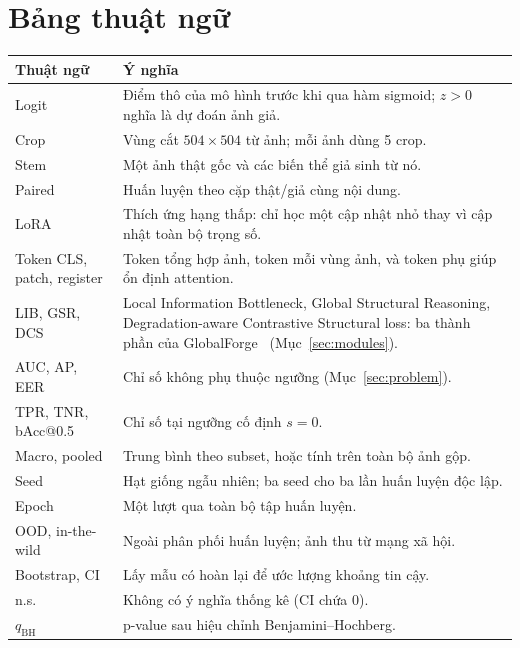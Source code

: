 \documentclass[11pt,a4paper]{article}
\begin{document}
\section{Bảng thuật ngữ}
\begin{table}[H]\centering\small
\begin{tabularx}{\linewidth}{l X}
\toprule
Thuật ngữ & Ý nghĩa \\
\midrule
Logit & Điểm thô của mô hình trước khi qua hàm sigmoid; $z>0$ nghĩa là dự đoán ảnh giả. \\
Crop & Vùng cắt $504\times504$ từ ảnh; mỗi ảnh dùng 5 crop. \\
Stem & Một ảnh thật gốc và các biến thể giả sinh từ nó. \\
Paired & Huấn luyện theo cặp thật/giả cùng nội dung. \\
LoRA & Thích ứng hạng thấp: chỉ học một cập nhật nhỏ thay vì cập nhật toàn bộ trọng số. \\
Token CLS, patch, register & Token tổng hợp ảnh, token mỗi vùng ảnh, và token phụ giúp ổn định attention. \\
LIB, GSR, DCS & Local Information Bottleneck, Global Structural Reasoning, Degradation-aware Contrastive Structural loss: ba thành phần của GlobalForge~\cite{cui2026globalforge} (Mục~\ref{sec:modules}). \\
AUC, AP, EER & Chỉ số không phụ thuộc ngưỡng (Mục~\ref{sec:problem}). \\
TPR, TNR, bAcc@0.5 & Chỉ số tại ngưỡng cố định $s=0$. \\
Macro, pooled & Trung bình theo subset, hoặc tính trên toàn bộ ảnh gộp. \\
Seed & Hạt giống ngẫu nhiên; ba seed cho ba lần huấn luyện độc lập. \\
Epoch & Một lượt qua toàn bộ tập huấn luyện. \\
OOD, in-the-wild & Ngoài phân phối huấn luyện; ảnh thu từ mạng xã hội. \\
Bootstrap, CI & Lấy mẫu có hoàn lại để ước lượng khoảng tin cậy. \\
n.s. & Không có ý nghĩa thống kê (CI chứa $0$). \\
$q_{\text{BH}}$ & p-value sau hiệu chỉnh Benjamini--Hochberg. \\
\bottomrule
\end{tabularx}
\end{table}



\end{document}
